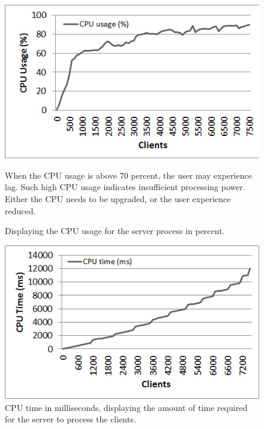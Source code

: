 \documentclass[bsc,frontabs,twoside,singlespacing,parskip,deptreport]{infthesis}     %
\begin{document}
\begin{center}
\begin{figure}
\centering
\includegraphics[scale=0.75]{images/test_CLIENT_CPUusage.jpg}
\caption{Displaying the CPU usage for the server process in percent.}
\label{fig:cpu_usage}
\vspace{1em}
When the CPU usage is above 70 percent, the user may experience lag. Such high CPU usage indicates insufficient processing power. Either the CPU needs to be upgraded, or the user experience reduced.
\end{figure}

\begin{figure}
\centering
\includegraphics[scale=0.75]{images/test_CLIENT_CPUtime.jpg}
\caption{CPU time in milliseconds, displaying the amount of time required for the server to process the clients.}
\label{fig:cpu_time}
\end{figure}


\end{center}
\end{document}
